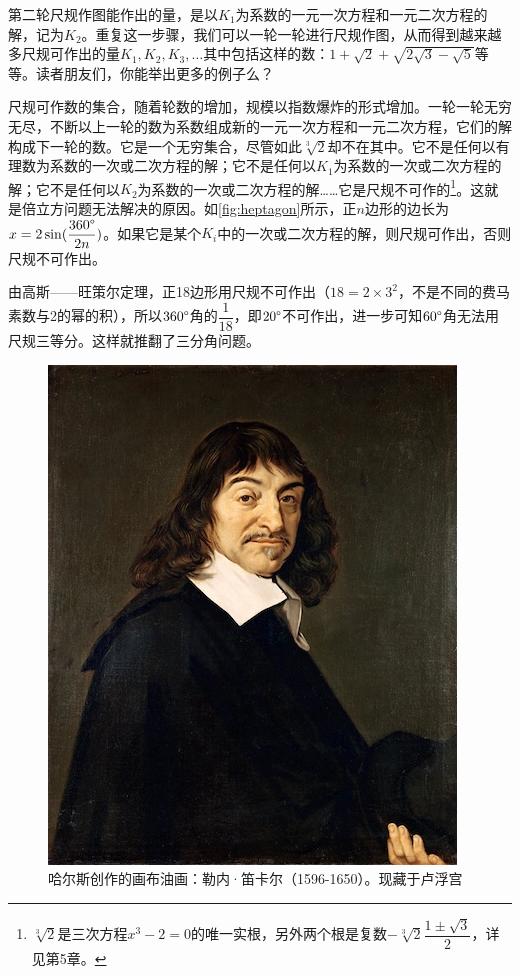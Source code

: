 \documentclass[b5paper]{ctexart}
\begin{document}
第二轮尺规作图能作出的量，是以$K_1$为系数的一元一次方程和一元二次方程的解，记为$K_2$。重复这一步骤，我们可以一轮一轮进行尺规作图，从而得到越来越多尺规可作出的量$K_1, K_2, K_3, \dotsc$其中包括这样的数：$1 + \sqrt{2} + \sqrt{2\sqrt{3} - \sqrt{5}}$等等。读者朋友们，你能举出更多的例子么？

尺规可作数的集合，随着轮数的增加，规模以指数爆炸的形式增加。一轮一轮无穷无尽，不断以上一轮的数为系数组成新的一元一次方程和一元二次方程，它们的解构成下一轮的数。它是一个无穷集合，尽管如此$\sqrt[3]{2}$却不在其中。它不是任何以有理数为系数的一次或二次方程的解；它不是任何以$K_1$为系数的一次或二次方程的解；它不是任何以$K_2$为系数的一次或二次方程的解……它是尺规不可作的\footnote{$\sqrt[3]{2}$是三次方程$x^3 - 2 = 0$的唯一实根，另外两个根是复数$-\sqrt[3]{2}\dfrac{1 \pm \sqrt{3}}{2}$，详见第5章。}。这就是倍立方问题无法解决的原因。如\cref{fig:heptagon}所示，正$n$边形的边长为$x = 2\sin(\dfrac{360\degree}{2n})$。如果它是某个$K_i$中的一次或二次方程的解，则尺规可作出，否则尺规不可作出。

由高斯——旺策尔定理，正18边形用尺规不可作出（$18 = 2 \times 3^2$，不是不同的费马素数与2的幂的积），所以$360\degree$角的$\dfrac{1}{18}$，即$20\degree$不可作出，进一步可知$60\degree$角无法用尺规三等分。这样就推翻了三分角问题。

\begin{figure}[htbp]
 \centering
 \includegraphics[scale=0.4]{img/Descartes}
 \caption{哈尔斯创作的画布油画：勒内·笛卡尔（1596-1650）。现藏于卢浮宫}
 \label{fig:Decartes}
\end{figure}
\end{document}
